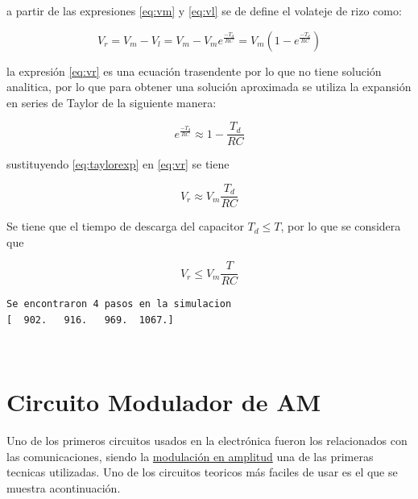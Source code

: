 \documentclass{article}
\begin{document}
a partir de las expresiones \eqref{eq:vm} y \eqref{eq:vl} se de define
el volateje de rizo como:

\begin{equation}\label{eq:vr}
V_{r}=V_{m}-V_{l}=V_{m}-V_{m}e^{\frac{-T_{d}}{RC}}=V_{m}(1-e^{\frac{-T_{d}}{RC}})
\end{equation}

la expresión \eqref{eq:vr} es una ecuación trasendente por lo que no
tiene solución analitica, por lo que para obtener una solución
aproximada se utiliza la expansión en series de Taylor de la siguiente
manera:

\begin{equation}\label{eq:taylorexp}
e^{\frac{-T_{d}}{RC}}\approx 1-\frac{T_{d}}{RC}
\end{equation}

sustituyendo \eqref{eq:taylorexp} en \eqref{eq:vr} se tiene

\begin{equation}\label{eq:vr2}
V_{r}\approx V_{m}\frac{T_{d}}{RC}
\end{equation}

Se tiene que el tiempo de descarga del capacitor $T_{d} \leq T$, por lo
que se considera que

\begin{equation}\label{eq:vr3}
V_{r} \leq V_{m}\frac{T}{RC}
\end{equation}


    \begin{Verbatim}[commandchars=\\\{\}]
Se encontraron 4 pasos en la simulacion
[  902.   916.   969.  1067.]
    \end{Verbatim}

    \begin{center}
    \end{center}
    { \hspace*{\fill} \\}
    
    \section{Circuito Modulador de AM}\label{circuito-modulador-de-am}

Uno de los primeros circuitos usados en la electrónica fueron los
relacionados con las comunicaciones, siendo la
\href{http://es.wikipedia.org/wiki/Amplitud_modulada}{modulación en
amplitud} una de las primeras tecnicas utilizadas. Uno de los circuitos
teoricos más faciles de usar es el que se muestra acontinuación.
\end{document}
